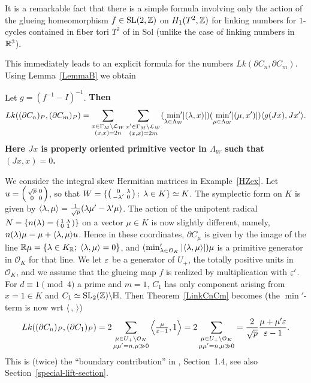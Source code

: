 It is a remarkable fact that there is a simple formula involving
only the action of the
glueing homeomorphism $f \in  \operatorname{SL}(2,\mathbb{Z})$ on $H_1(T^2, \mathbb{Z})$ for
linking numbers for $1$-cycles contained in fiber tori $T^2$ of in
Sol (unlike the case of linking numbers in $\mathbb{R}^3$).

This immediately leads to an explicit formula for the numbers
$Lk(\partial C_n, \partial C_m)$. Using Lemma~\ref{LemmaB} we obtain

\begin{theorem}\label{LinkCnCm} 
Let $g = (f^{-1} - I)^{-1}$. \bf{Then}
 \[
 Lk( (\partial C_n)_P, (\partial C_m)_P) = \sum_{ \substack{x\in \Gamma_M \backslash \mathcal{L}_W \\ (x,x)=2n}} \sum_{\substack{x'\in \Gamma_M \backslash \mathcal{L}_W \\ (x,x)=2m}} (\min_{\lambda \in \Lambda_W}  {\hspace{-5pt}'}
 |(\lambda,x)|) (\min_{\mu \in \Lambda_W}  {\hspace{-5pt}'}
|(\mu,x')|) \langle g(Jx),Jx' \rangle. 
\]
Here $Jx$ is properly oriented primitive vector in $\Lambda_W$ such that $(Jx,x)=0$. 
 \end{theorem}

 \begin{example}\label{LinkCnCmex} 
We consider the integral skew Hermitian matrices in Example~\ref{HZex}.
Let $u= \left(\begin{smallmatrix} \sqrt{p} & 0 \\ 0 & 0\end{smallmatrix}\right)$, so that $W = \{
\left(\begin{smallmatrix} 0 & \lambda \\ -\lambda' & 0\end{smallmatrix}\right);\; \lambda \in K \} \simeq K$. The symplectic
form on $K$ is given by $\langle \lambda, \mu \rangle = \frac{1}{\sqrt{p}}
(\lambda \mu' - \lambda'\mu)$. The action of the unipotent radical $N=
\left\{ n(\lambda)= \left(\begin{smallmatrix} 1 & \lambda \\ 0 & 1\end{smallmatrix}\right) \right\}$ on a vector $\mu \in
K$ is now slightly different, namely, $n(\lambda) \mu = \mu + \langle
\lambda, \mu \rangle u$. Hence in these coordinates, $\partial C_{\mu}$
is given by the image of the line $\mathbb{R} \mu = \{\lambda \in K_{\mathbb{R}}; \;
\langle \lambda, \mu \rangle =0 \}$, and $(\min'_{\lambda \in \mathcal{O}_K}
 |\langle \lambda, \mu \rangle|)\mu$ is a primitive generator in
 $\mathcal{O}_K$ for that line. We let $\varepsilon$ be a generator of
 $U_+$, the totally positive units in $\mathcal{O}_K$, and we assume
 that the glueing map $f$ is realized by multiplication with $\varepsilon'$.
 For $d \equiv 1 \pmod{4}$ a prime and $m=1$, $C_1$ has only component
 arising from $x =1 \in K$ and $C_1 \simeq \operatorname{SL}_2(\mathbb{Z}) \backslash \mathbb{H}$.
 Then Theorem~\ref{LinkCnCm} becomes (the $\min'$-term is now wrt
 $\langle\,,\, \rangle$)
\[
 Lk( (\partial C_n)_P, (\partial C_1)_P) = 
 2 \sum_{ \substack{\mu \in U_+ \backslash \mathcal{O}_K\\ \mu\mu'=n, \mu \gg 0}} \left\langle \tfrac{\mu}{\varepsilon-1}, 1 \right\rangle = 2\sum_{ \substack{\mu \in U_+ \backslash \mathcal{O}_K\\ \mu\mu'=n, \mu \gg0}}  = \frac{2}{\sqrt{p}}\frac{\mu+\mu'\varepsilon}{\varepsilon-1}.
\]
This is (twice) the ``boundary contribution'' in \cite{HZ},
Section~1.4, see also Section~\ref{special-lift-section}.
\end{example}


